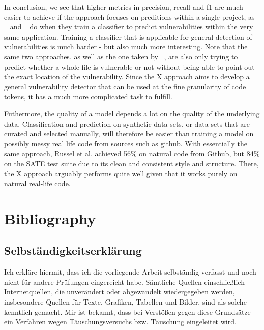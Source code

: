 \documentclass[
	a4paper,
	pagesize,
	pdftex,
	12pt,
	twoside, %
	BCOR=5mm, %
	ngerman,
	fleqn,
	final,
	]{scrartcl}
\begin{document}
In conclusion, we see that higher metrics in precision, recall and f1 are much easier to achieve if the approach focuses on preditions within a single project, as ~\cite{Hovsepyan.2012} and ~\cite{Dam.2017} do when they train a classifier to predict vulnerabilities within the very same application. Training a classifier that is applicable for general detection of vulnerabilities is much harder - but also much more interesting. Note that the same two approaches, as well as the one taken by  ~\cite{Pang.2015}, are also only trying to predict whether a whole file is vulnerable or not without being able to point out the exact location of the vulnerability. Since the X approach aims to develop a general vulnerability detector that can be used at the fine granularity of code tokens, it has a much more complicated task to fulfill.

Futhermore, the quality of a model depends a lot on the quality of the underlying data. Classification and prediction on synthetic data sets, or data sets that are curated and selected manually, will therefore be easier than training a model on possibly messy real life code from sources such as github. With essentially the same approach, Russel et al. achieved 56\% on natural code from Github, but 84\% on the SATE test suite due to its clean and consistent style and structure. There, the X approach arguably performs quite well given that it works purely on natural real-life code. 



\section{Bibliography}






\cleardoublepage%
{\parindent0cm
	\subsection*{Selbständigkeitserklärung}
	Ich erkläre hiermit, dass ich die vorliegende Arbeit selbständig verfasst
	und noch nicht für andere Prüfungen eingereicht habe.
	Sämtliche Quellen einschließlich Internetquellen, die unverändert oder
	abgewandelt wiedergegeben werden, insbesondere Quellen für Texte, Grafiken,
	Tabellen und Bilder, sind als solche kenntlich gemacht. Mir ist bekannt,
	dass bei Verstößen gegen diese Grundsätze ein Verfahren wegen
	Täuschungsversuchs bzw. Täuschung eingeleitet wird.
	\vspace{3\baselineskip}
	
}
\end{document}
